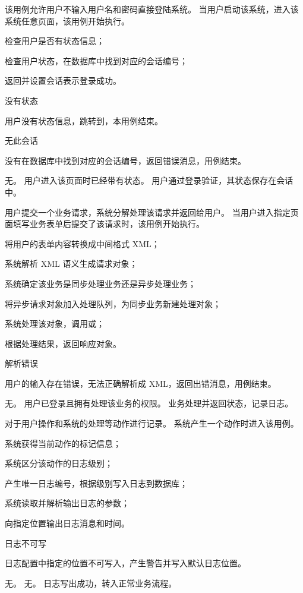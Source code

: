 \documentclass[cs4size,a4paper,nofonts]{ctexart}
\begin{document}
{该用例允许用户不输入用户名和密码直接登陆系统。} %
{当用户启动该系统，进入该系统任意页面，该用例开始执行。} %
{
\item 检查用户是否有状态信息；
\item 检查用户状态，在数据库中找到对应的会话编号；
\item 返回并设置会话表示登录成功。
} %
{} %
{
\item 没有状态\par
用户没有状态信息，跳转到，本用例结束。
\item 无此会话\par
没有在数据库中找到对应的会话编号，返回错误消息，用例结束。
} %
{无。} %
{用户进入该页面时已经带有状态。} %
{用户通过登录验证，其状态保存在会话中。} %

{用户提交一个业务请求，系统分解处理该请求并返回给用户。} %
{当用户进入指定页面填写业务表单后提交了该请求时，该用例开始执行。} %
{
\item 将用户的表单内容转换成中间格式 XML；
\item 系统解析 XML 语义生成请求对象；
\item 系统确定该业务是同步处理业务还是异步处理业务；
\item 将异步请求对象加入处理队列，为同步业务新建处理对象；
\item 系统处理该对象，调用或；
\item 根据处理结果，返回响应对象。
} %
{} %
{
\item 解析错误\par
用户的输入存在错误，无法正确解析成 XML，返回出错消息，用例结束。
} %
{无。} %
{用户已登录且拥有处理该业务的权限。} %
{业务处理并返回状态，记录日志。} %

{对于用户操作和系统的处理等动作进行记录。} %
{系统产生一个动作时进入该用例。} %
{
\item 系统获得当前动作的标记信息；
\item 系统区分该动作的日志级别；
\item 产生唯一日志编号，根据级别写入日志到数据库；
\item 系统读取并解析输出日志的参数；
\item 向指定位置输出日志消息和时间。
} %
{} %
{
\item 日志不可写\par
日志配置中指定的位置不可写入，产生警告并写入默认日志位置。
} %
{无。} %
{无。} %
{日志写出成功，转入正常业务流程。} %
\end{document}
